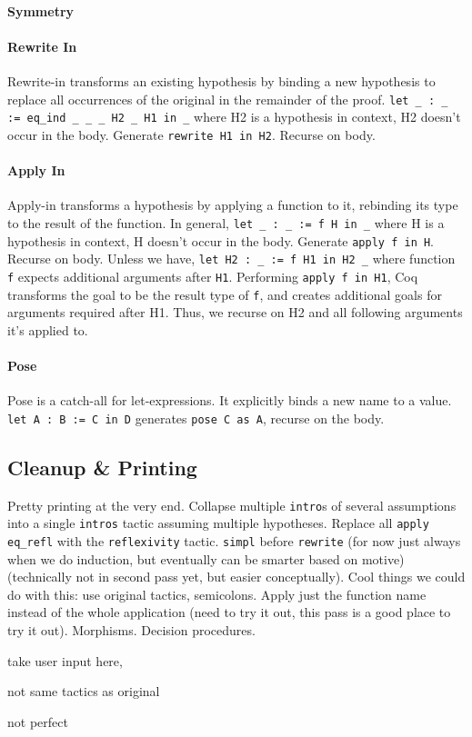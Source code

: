 \paragraph{Symmetry}

\paragraph{Rewrite In}
Rewrite-in transforms an existing hypothesis by binding a new hypothesis to replace all occurrences of the original in the remainder of the proof.
\lstinline{let _ : _ := eq_ind _ _ _ H2 _ H1 in _} where
		H2 is a hypothesis in context,
		H2 doesn’t occur in the body.
		Generate \lstinline{rewrite H1 in H2}. Recurse on body.

\paragraph{Apply In}
Apply-in transforms a hypothesis by applying a function to it, rebinding its type to the result of the function.
		In general,
		\lstinline{let _ : _ := f H in _} where
		H is a hypothesis in context,
		H doesn’t occur in the body.
		Generate  \lstinline{apply f in H}. Recurse on body.
		Unless we have,
		\lstinline{let H2 : _ := f H1 in H2 _} where
function \lstinline{f} expects additional arguments after \lstinline{H1}.
Performing \lstinline{apply f in H1}, Coq transforms the goal to be the result type of \lstinline{f}, and creates additional goals for arguments required after H1. Thus, we recurse on H2 and all following arguments it’s applied to.

\paragraph{Pose}
Pose is a catch-all for let-expressions. It explicitly binds a new name to a value.
\lstinline{let A : B := C in D} generates \lstinline{pose C as A}, recurse on the body.

\subsection{Cleanup \& Printing}
\label{sec:second}

Pretty printing at the very end.
Collapse multiple \lstinline{intro}s of several assumptions into a single \lstinline{intros} tactic assuming multiple hypotheses.
Replace all \lstinline{apply eq_refl} with the \lstinline{reflexivity} tactic.
\lstinline{simpl} before \lstinline{rewrite} (for now just always when we do induction, but eventually can be smarter based on motive) (technically not
in second pass yet, but easier conceptually).
Cool things we could do with this: use original tactics, semicolons. Apply just the function name instead of the whole application (need to try it out, this pass is a good place to try it out). Morphisms. Decision procedures.

take user input here,

not same tactics as original

not perfect





